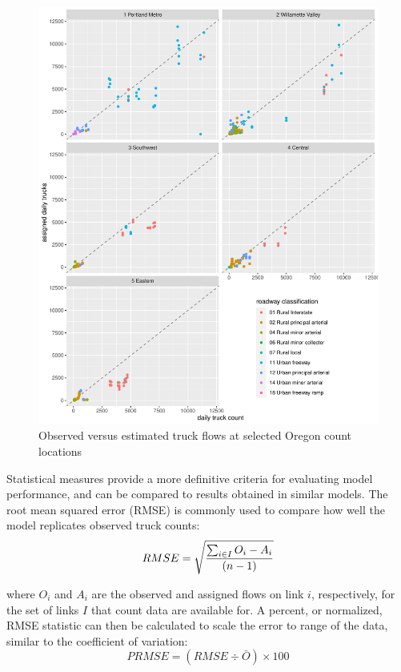 \begin{figure}
\centering
\includegraphics[width=6.5in]{figures/graph-final-validation-scatter.pdf}
\caption{Observed versus estimated truck flows at selected Oregon count locations}
\label{fig:ct-link-scattergram}
\end{figure}

Statistical measures provide a more definitive criteria for evaluating model performance, and can be compared to results obtained in similar models. The root mean squared error (RMSE) is commonly used to compare how well the model replicates observed truck counts:
\begin{equation}
RMSE = \sqrt {\sum_{i \in I} O_i - A_i \over (n - 1)}
\end{equation}

\noindent where $O_i$ and $A_i$ are the observed and assigned flows on link $i$, respectively, for the set of links $I$ that count data are available for. A percent, or normalized, RMSE statistic can then be calculated to scale the error to range of the data, similar to the coefficient of variation:
\begin{equation}
PRMSE = (RMSE \div \bar O) \times 100
\end{equation}

